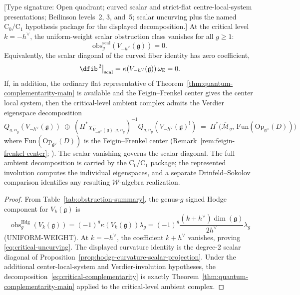 \begin{corollary}
\label{cor:critical-uncurving}
\textup{[Type signature: Open quadrant; curved scalar and strict-flat
centre-local-system presentations; Beilinson levels~2, 3, and~5;
scalar uncurving plus the named \(\mathrm C_0/\mathrm C_1\) hypothesis
package for the displayed decomposition.]}
At the critical level $k = -h^\vee$, the uniform-weight scalar
obstruction class vanishes for all $g \geq 1$:
\begin{equation}\label{eq:critical-uncurving}
\mathrm{obs}^{\mathrm{scal}}_g(V_{-h^\vee}(\mathfrak g)) = 0 .
\end{equation}
Equivalently, the scalar diagonal of the curved fiber identity has
zero coefficient,
\[
\dfib^{\,2}\big|_{\mathrm{scal}}
=
\kappa(V_{-h^\vee}(\mathfrak g))\,\omega_{\mathbb E}=0 .
\]
If, in addition, the ordinary flat representative of
Theorem~\textup{\ref{thm:quantum-complementarity-main}} is available
and the Feigin--Frenkel center gives the center local system, then
the critical-level ambient complex admits the Verdier eigenspace
decomposition
\begin{equation}\label{eq:critical-complementarity}
Q_{g,n_g}(V_{-h^\vee}(\mathfrak g))
\;\oplus\;
(H^*\chi^-_{V_{-h^\vee}(\mathfrak g);g,n_g})^{-1}
Q_{g,n_g}(V_{-h^\vee}(\mathfrak g)^!)
\;=\;
H^*\!\bigl(\overline{\mathcal{M}}_g,\,
\mathrm{Fun}(\mathrm{Op}_{\mathfrak{g}^\vee}(D))\bigr)
\end{equation}
where $\mathrm{Fun}(\mathrm{Op}_{\mathfrak{g}^\vee}(D))$ is the
Feigin--Frenkel center
(Remark~\ref{rem:feigin-frenkel-center}; \cite{Feigin-Frenkel}).
The scalar vanishing governs the scalar diagonal.  The full ambient
decomposition is carried by the \(\mathrm C_0/\mathrm C_1\) package;
the represented involution computes the individual eigenspaces, and a
separate Drinfeld--Sokolov comparison identifies any resulting
$\mathcal W$-algebra realization.
\end{corollary}

\begin{proof}
From Table~\ref{tab:obstruction-summary}, the genus-$g$ signed Hodge
component for $V_k(\mathfrak g)$ is
\[
\operatorname{obs}^{\mathrm{Hdg}}_g(V_k(\mathfrak g))
=(-1)^g\kappa(V_k(\mathfrak g))\lambda_g
=(-1)^g\frac{(k+h^\vee)\dim(\mathfrak{g})}{2h^\vee}\lambda_g
\]
\textup{(}UNIFORM-WEIGHT\textup{)}.
At $k = -h^\vee$, the coefficient $k + h^\vee$ vanishes, proving
\eqref{eq:critical-uncurving}. The displayed curvature identity is
the degree-$2$ scalar diagonal of
Proposition~\ref{prop:hodge-curvature-scalar-projection}. Under the
additional center-local-system and Verdier-involution hypotheses, the
decomposition~\eqref{eq:critical-complementarity} is exactly
Theorem~\ref{thm:quantum-complementarity-main} applied to the
critical-level ambient complex.
\end{proof}

